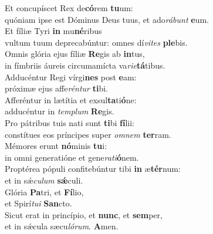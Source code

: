 \oddverse Et concupíscet Rex de\textbf{có}rem \textbf{tu}um:~\*\\
\oddverse quóniam ipse est Dóminus Deus tuus, et ado\textit{rá}\textit{bunt} \textbf{e}um.\\
\evenverse Et fíliæ Tyri \textbf{in} mu\textbf{né}ribus~\*\\
\evenverse vultum tuum deprecabúntur: omnes dí\textit{vi}\textit{tes} \textbf{ple}bis.\\
\oddverse Omnis glória ejus fíliæ \textbf{Re}gis ab \textbf{in}tus,~\*\\
\oddverse in fímbriis áureis circumamícta va\textit{ri}\textit{e}\textbf{tá}tibus.\\
\evenverse Adducéntur Regi vírgi\textbf{nes} post \textbf{e}am:~\*\\
\evenverse próximæ ejus affe\textit{rén}\textit{tur} \textbf{ti}bi.\\
\oddverse Afferéntur in lætítia et exsul\textbf{ta}ti\textbf{ó}ne:~\*\\
\oddverse adducéntur in \textit{tem}\textit{plum} \textbf{Re}gis.\\
\evenverse Pro pátribus tuis nati sunt \textbf{ti}bi \textbf{fí}lii:~\*\\
\evenverse constítues eos príncipes super \textit{om}\textit{nem} \textbf{ter}ram.\\
\oddverse Mémores erunt \textbf{nó}minis \textbf{tu}i:~\*\\
\oddverse in omni generatióne et gene\textit{ra}\textit{ti}\textbf{ó}nem.\\
\evenverse Proptérea pópuli confitebúntur tibi \textbf{in} æ\textbf{tér}num:~\*\\
\evenverse et in sǽ\textit{cu}\textit{lum} \textbf{sǽ}culi.\\
\oddverse Glória \textbf{Pa}tri, et \textbf{Fí}lio,~\*\\
\oddverse et Spirí\textit{tu}\textit{i} \textbf{San}cto.\\
\evenverse Sicut erat in princípio, et \textbf{nunc}, et \textbf{sem}per,~\*\\
\evenverse et in sǽcula sæcu\textit{ló}\textit{rum}. \textbf{A}men.\\
